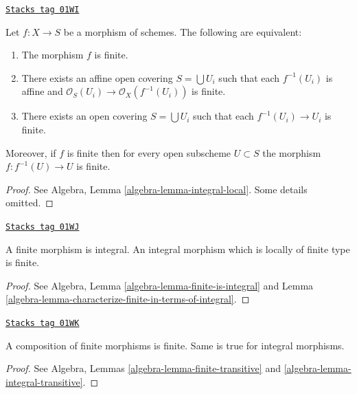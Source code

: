 \begin{lemma}
\label{morphisms-lemma-finite-local}
\href{https://stacks.math.columbia.edu/tag/01WI}{\texttt{Stacks tag 01WI}}

Let $f : X \to S$ be a morphism of schemes.
The following are equivalent:
\begin{enumerate}
\item The morphism $f$ is finite.
\item There exists an affine open covering $S = \bigcup U_i$ such that
each $f^{-1}(U_i)$ is affine and
$\mathcal{O}_S(U_i) \to \mathcal{O}_X(f^{-1}(U_i))$ is finite.
\item There exists an open covering $S = \bigcup U_i$
such that each $f^{-1}(U_i) \to U_i$ is finite.
\end{enumerate}
Moreover, if $f$ is finite then for every open subscheme
$U \subset S$ the morphism $f : f^{-1}(U) \to U$ is finite.
\end{lemma}

\begin{proof}
See Algebra, Lemma \ref{algebra-lemma-integral-local}.
Some details omitted.
\end{proof}

\begin{lemma}
\label{morphisms-lemma-finite-integral}
\href{https://stacks.math.columbia.edu/tag/01WJ}{\texttt{Stacks tag 01WJ}}

A finite morphism is integral.
An integral morphism which is locally of finite type is finite.
\end{lemma}

\begin{proof}
See Algebra, Lemma \ref{algebra-lemma-finite-is-integral}
and Lemma \ref{algebra-lemma-characterize-finite-in-terms-of-integral}.
\end{proof}

\begin{lemma}
\label{morphisms-lemma-composition-finite}
\href{https://stacks.math.columbia.edu/tag/01WK}{\texttt{Stacks tag 01WK}}

A composition of finite morphisms is finite.
Same is true for integral morphisms.
\end{lemma}

\begin{proof}
See Algebra, Lemmas \ref{algebra-lemma-finite-transitive}
and \ref{algebra-lemma-integral-transitive}.
\end{proof}

